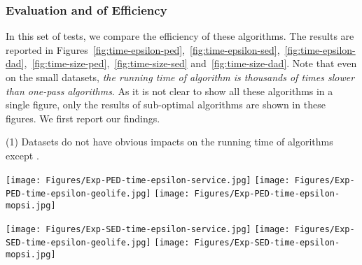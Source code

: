 {%
\subsubsection{Evaluation and  of Efficiency}

In this set of tests, we compare the efficiency of these algorithms.
The results are reported in Figures~\ref{fig:time-epsilon-ped},~\ref{fig:time-epsilon-sed},~\ref{fig:time-epsilon-dad},~\ref{fig:time-size-ped},~\ref{fig:time-size-sed} and~\ref{fig:time-size-dad}.
Note that even on the small datasets, \emph{the running time of algorithm \opt  is thousands of times slower than one-pass algorithms}. As it is not clear to show all these algorithms in a single figure, only the results of sub-optimal algorithms are shown in these figures.
We first report our findings.



\sstab (1) {Datasets do not have obvious impacts on the running time of \lsa algorithms except \dagots. }

	
	
	
	\begin{figure*}[tb!]
		\centering
		\texttt{[image: Figures/Exp-PED-time-epsilon-service.jpg]}	\hspace{0.5ex}
		\texttt{[image: Figures/Exp-PED-time-epsilon-geolife.jpg]}	\hspace{0.5ex}
		\texttt{[image: Figures/Exp-PED-time-epsilon-mopsi.jpg]}	
		\vspace{-2ex}
		\caption{\small Evaluation of running time (\ped) on full datasets: varying the error bound $\epsilon$.}\label{fig:time-epsilon-ped}
		\vspace{-2ex}
	\end{figure*}
	
	\begin{figure*}[tb!]
		\centering
		\texttt{[image: Figures/Exp-SED-time-epsilon-service.jpg]}	\hspace{0.5ex}
		\texttt{[image: Figures/Exp-SED-time-epsilon-geolife.jpg]}	\hspace{0.5ex}
		\texttt{[image: Figures/Exp-SED-time-epsilon-mopsi.jpg]}	
		\vspace{-2ex}
		\caption{\small Evaluation of running time (\sed) on full datasets: varying the error bound $\epsilon$.}\label{fig:time-epsilon-sed}
		\vspace{-2ex}
	\end{figure*}
	
}
